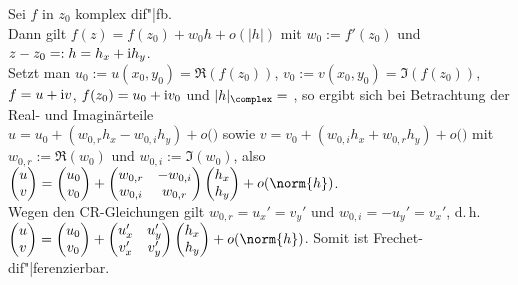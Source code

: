 Sei $f$ in $z_0$ komplex dif"|fb.\\
Dann gilt $f(z) = f(z_0) + w_0 h + o(|h|)$ mit $w_0 := f'(z_0)$
und $z - z_0 =: h = h_x + \mathrm{i} h_y$.\\
Setzt man $u_0 := u(x_0, y_0) = \Re(f(z_0))$,
$v_0 := v(x_0, y_0) = \Im(f(z_0))$,
$f = u + \mathrm{i} v$,
$f(z_0) = u_0 + \mathrm{i} v_0$ und
$|h|_\complex =$
,
so ergibt sich bei Betrachtung der Real- und Imaginärteile\\
$u = u_0 + (w_{0,r} h_x - w_{0,i} h_y) + o\Big($$\Big)$ sowie
$v = v_0 + (w_{0,i} h_x + w_{0,r} h_y) + o\Big($$\Big)$
mit $w_{0,r} := \Re(w_0)$ und $w_{0,i} := \Im(w_0)$,
also
$\begin{pmatrix}u\\v\end{pmatrix} = \begin{pmatrix}u_0\\v_0\end{pmatrix} +
\begin{pmatrix}w_{0,r} & -w_{0,i}\\w_{0,i} & w_{0,r}\end{pmatrix}
\begin{pmatrix}h_x\\h_y\end{pmatrix} + o(\norm{h})$.\\
Wegen den CR-Gleichungen gilt $w_{0,r} = u_x' = v_y'$ und
$w_{0,i} = -u_y' = v_x'$, d.\,h.\\
$\begin{pmatrix}u\\v\end{pmatrix} = \begin{pmatrix}u_0\\v_0\end{pmatrix} +
\begin{pmatrix}u_x' & u_y'\\v_x' & v_y'\end{pmatrix}
\begin{pmatrix}h_x\\h_y\end{pmatrix} + o(\norm{h})$.
Somit ist 
Frechet-dif"|ferenzierbar.

